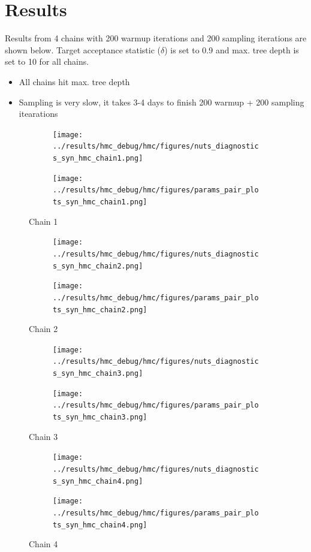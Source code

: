 \documentclass[12pt]{article}
\begin{document}
 \section*{Results}
 Results from 4 chains with 200 warmup iterations and 200 sampling iterations are shown below. Target acceptance statistic ($\delta$) is set to 0.9 and max. tree depth is set to 10 for all chains.
 \begin{itemize}
 \item All chains hit max. tree depth
 \item Sampling is very slow, it takes 3-4 days to finish 200 warmup + 200 sampling itearations
 \end{itemize}
 \begin{figure}[h!]
   \centering
   \begin{subfigure}{1.0\linewidth}
     \texttt{[image: ../results/hmc\_debug/hmc/figures/nuts\_diagnostics\_syn\_hmc\_chain1.png]}
   \end{subfigure}
   \begin{subfigure}{1.0\linewidth}
     \texttt{[image: ../results/hmc\_debug/hmc/figures/params\_pair\_plots\_syn\_hmc\_chain1.png]}
   \end{subfigure}
   \caption{Chain 1}
   \label{fig:nuts_diags_chain1}
 \end{figure}
 \begin{figure}[h!]
   \centering
   \begin{subfigure}{1.0\linewidth}
     \texttt{[image: ../results/hmc\_debug/hmc/figures/nuts\_diagnostics\_syn\_hmc\_chain2.png]}
   \end{subfigure}
   \begin{subfigure}{1.0\linewidth}
     \texttt{[image: ../results/hmc\_debug/hmc/figures/params\_pair\_plots\_syn\_hmc\_chain2.png]}
   \end{subfigure}
   \caption{Chain 2}
   \label{fig:nuts_diags_chain2}
 \end{figure}
 \begin{figure}[h!]
   \centering
   \begin{subfigure}{1.0\linewidth}
     \texttt{[image: ../results/hmc\_debug/hmc/figures/nuts\_diagnostics\_syn\_hmc\_chain3.png]}
   \end{subfigure}
   \begin{subfigure}{1.0\linewidth}
     \texttt{[image: ../results/hmc\_debug/hmc/figures/params\_pair\_plots\_syn\_hmc\_chain3.png]}
   \end{subfigure}
   \caption{Chain 3}
   \label{fig:nuts_diags_chain3}
 \end{figure}
 \begin{figure}[h!]
   \centering
   \begin{subfigure}{1.0\linewidth}
     \texttt{[image: ../results/hmc\_debug/hmc/figures/nuts\_diagnostics\_syn\_hmc\_chain4.png]}
   \end{subfigure}
   \begin{subfigure}{1.0\linewidth}
     \texttt{[image: ../results/hmc\_debug/hmc/figures/params\_pair\_plots\_syn\_hmc\_chain4.png]}
   \end{subfigure}
   \caption{Chain 4}
   \label{fig:nuts_diags_chain4}
 \end{figure}
\end{document}
